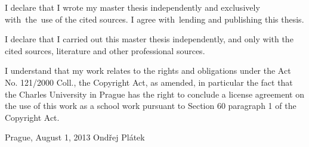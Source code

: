\vspace{\fill} %
\noindent
I declare that I wrote my master thesis independently and exclusively with~the~use of the cited sources. I agree with~lending and publishing this thesis.


\medskip\noindent
I declare that I carried out this master thesis independently, and only with the cited sources, literature and other professional sources.

I understand that my work relates to the rights and obligations under the Act No. 121/2000 Coll., the Copyright Act, as amended, in particular the fact that the Charles University in Prague has the right to conclude a license agreement on the use of this work as a school work pursuant to Section 60 paragraph 1 of the Copyright Act.

\noindent Prague, August 1, 2013 \hspace{\fill}Ondřej Plátek 


%

\newpage

